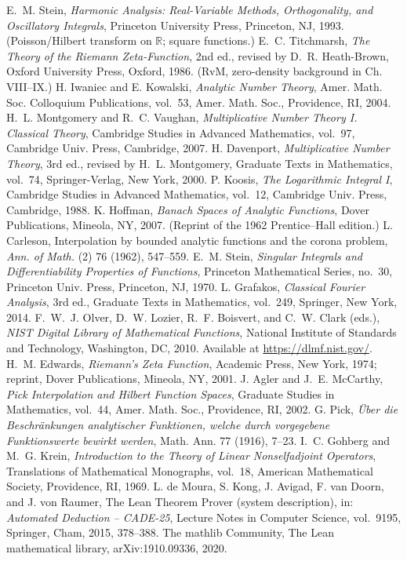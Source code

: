 \documentclass[11pt]{article}
\theoremstyle{definition}
\theoremstyle{remark}
\begin{document}
\begin{thebibliography}{99}
 E.~M. Stein, \emph{Harmonic Analysis: Real-Variable Methods, Orthogonality, and Oscillatory Integrals}, Princeton University Press, Princeton, NJ, 1993. (Poisson/Hilbert transform on $\mathbb R$; square functions.)
 E.~C. Titchmarsh, \emph{The Theory of the Riemann Zeta-Function}, 2nd ed., revised by D.~R. Heath-Brown, Oxford University Press, Oxford, 1986. (RvM, zero-density background in Ch. VIII--IX.)
 H. Iwaniec and E. Kowalski, \emph{Analytic Number Theory}, Amer. Math. Soc. Colloquium Publications, vol.~53, Amer. Math. Soc., Providence, RI, 2004.
 H.~L. Montgomery and R.~C. Vaughan, \emph{Multiplicative Number Theory I. Classical Theory}, Cambridge Studies in Advanced Mathematics, vol.~97, Cambridge Univ. Press, Cambridge, 2007.
 H. Davenport, \emph{Multiplicative Number Theory}, 3rd ed., revised by H.~L. Montgomery, Graduate Texts in Mathematics, vol.~74, Springer-Verlag, New York, 2000.
 P. Koosis, \emph{The Logarithmic Integral I}, Cambridge Studies in Advanced Mathematics, vol.~12, Cambridge Univ. Press, Cambridge, 1988.
 K. Hoffman, \emph{Banach Spaces of Analytic Functions}, Dover Publications, Mineola, NY, 2007. (Reprint of the 1962 Prentice--Hall edition.)
 L. Carleson, Interpolation by bounded analytic functions and the corona problem, \emph{Ann. of Math.} (2) 76 (1962), 547--559.
 E.~M. Stein, \emph{Singular Integrals and Differentiability Properties of Functions}, Princeton Mathematical Series, no.~30, Princeton Univ. Press, Princeton, NJ, 1970.
 L. Grafakos, \emph{Classical Fourier Analysis}, 3rd ed., Graduate Texts in Mathematics, vol.~249, Springer, New York, 2014.
 F.~W.~J. Olver, D.~W. Lozier, R.~F. Boisvert, and C.~W. Clark (eds.), \emph{NIST Digital Library of Mathematical Functions}, National Institute of Standards and Technology, Washington, DC, 2010. Available at \url{https://dlmf.nist.gov/}.
 H.~M. Edwards, \emph{Riemann's Zeta Function}, Academic Press, New York, 1974; reprint, Dover Publications, Mineola, NY, 2001.
 J. Agler and J.~E. McCarthy, \emph{Pick Interpolation and Hilbert Function Spaces}, Graduate Studies in Mathematics, vol.~44, Amer. Math. Soc., Providence, RI, 2002.
 G. Pick, \emph{Über die Beschränkungen analytischer Funktionen, welche durch vorgegebene Funktionswerte bewirkt werden}, Math. Ann. 77 (1916), 7--23.
 I.~C. Gohberg and M.~G. Krein, \emph{Introduction to the Theory of Linear Nonselfadjoint Operators}, Translations of Mathematical Monographs, vol.~18, American Mathematical Society, Providence, RI, 1969.
 L. de Moura, S. Kong, J. Avigad, F. van Doorn, and J. von Raumer, The Lean Theorem Prover (system description), in: \emph{Automated Deduction -- CADE-25}, Lecture Notes in Computer Science, vol.~9195, Springer, Cham, 2015, 378--388.
 The mathlib Community, The Lean mathematical library, arXiv:1910.09336, 2020.
\end{thebibliography}
\end{document}

